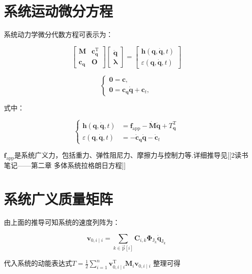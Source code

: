 \section{系统运动微分方程}
系统动力学微分代数方程可表示为：

\[
\left[\begin{array}{ll}
\boldsymbol{M} & \boldsymbol{c}_{\boldsymbol{q}}^{\mathrm{T}} \\
\boldsymbol{c}_{\boldsymbol{q}} & \boldsymbol{O}
\end{array}\right]\left[\begin{array}{l}
\ddot{\boldsymbol{q}} \\
\boldsymbol{\lambda}
\end{array}\right]=\left[\begin{array}{l}
\boldsymbol{h}(\boldsymbol{q}, \dot{\boldsymbol{q}}, t) \\
\varepsilon(\boldsymbol{q}, \dot{\boldsymbol{q}}, t)
\end{array}\right]
\]

\[
\left\{\begin{array}{l}
\mathbf{0}=\boldsymbol{c}, \\
\mathbf{0}=\boldsymbol{c}_{\boldsymbol{q}} \dot{\boldsymbol{q}}+\boldsymbol{c}_{t},
\end{array}\right.
\]

式中：

\[
\left\{\begin{aligned}
\boldsymbol{h}(\boldsymbol{q}, \dot{\boldsymbol{q}}, t) & =\boldsymbol{f}_{\mathrm{app}}-\dot{\boldsymbol{M}} \dot{\boldsymbol{q}}+T_{\boldsymbol{q}}^{\mathrm{T}} \\
\varepsilon(\boldsymbol{q}, \dot{\boldsymbol{q}}, t) & =-\dot{\boldsymbol{c}}_{\boldsymbol{q}} \dot{\boldsymbol{q}}-\dot{\boldsymbol{c}}_{t}
\end{aligned}\right.
\]

$\boldsymbol{f}_{\mathrm{app}}$是系统广义力，包括重力、弹性阻尼力、摩擦力与控制力等.详细推导见[[2读书笔记——第二章 多体系统拉格朗日方程]]
\section{系统广义质量矩阵}
由上面的推导可知系统的速度列阵为：

\[
\boldsymbol{v}_{0, i \mid i}=\sum_{k \in \overrightarrow{\mathrm{p}}[i]} \boldsymbol{C}_{i, k} \boldsymbol{\Phi}_{\mathrm{J}_{k}} \dot{\boldsymbol{q}}_{\mathrm{J}_{k}}
\]

代入系统的动能表达式$T=\frac{1}{2} \sum_{i=1}^{n} \boldsymbol{v}_{0, i \mid i}^{\mathrm{T}} \boldsymbol{M}_{i} \boldsymbol{v}_{0, i \mid i}$ 整理可得

